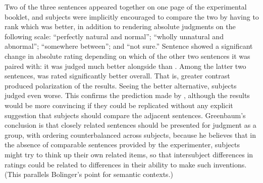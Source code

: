 \noindent
Two of the three sentences appeared together on one page of the experimental booklet, and subjects were implicitly encouraged to compare the two by having to
rank which was better, in addition to rendering absolute judgments on the following scale: ``perfectly natural and normal''; ``wholly unnatural and abnormal''; ``somewhere between''; and ``not sure.'' Sentence  showed a significant change in absolute rating depending on which of the other two sentences it was paired with: it was judged much better alongside  than . Among the latter two sentences,  was rated significantly better overall. That is, greater contrast produced polarization of the results. Seeing the better alternative, subjects judged  even worse. This confirms the prediction made by \citet{Bever1970a}, although the results would be more convincing if they could be replicated without any explicit suggestion that subjects should compare the adjacent sentences. Greenbaum's conclusion is that closely related sentences should be presented for judgment as a group, with ordering counterbalanced across subjects, because he believes that in the absence of comparable sentences provided by the experimenter, subjects might try to think up their own related items, so that intersubject differences in ratings could be related to differences in their ability to make such inventions. (This parallels Bolinger's point for semantic contexts.)

